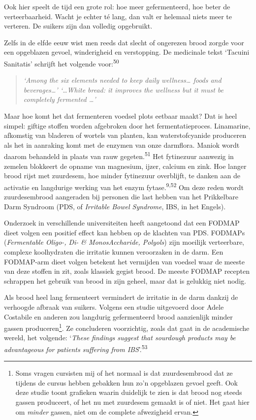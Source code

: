 \documentclass[
  11pt,
  dutch,
]{memoir}
\begin{document}
Ook hier speelt de tijd een grote rol: hoe meer gefermenteerd, hoe beter
de verteerbaarheid. Wacht je echter té lang, dan valt er helemaal niets
meer te verteren. De suikers zijn dan volledig opgebruikt.

Zelfs in de elfde eeuw wist men reeds dat slecht of ongerezen brood
zorgde voor een opgeblazen gevoel, winderigheid en verstopping. De
medicinale tekst `Tacuini Sanitatis' schrijft het volgende
voor:\textsuperscript{50}

\begin{quote}
\emph{`Among the six elements needed to keep daily wellness\ldots{}
foods and beverages\ldots{}' `\ldots White bread: it improves the
wellness but it must be completely fermented \ldots{}'}
\end{quote}

Maar hoe komt het dat fermenteren voedsel plots eetbaar maakt? Dat is
heel simpel: giftige stoffen worden afgebroken door het
fermentatieproces. Linamarine, afkomstig van bladeren of wortels van
planten, kan waterstofcyanide produceren als het in aanraking komt met
de enzymen van onze darmflora. Maniok wordt daarom behandeld in plaats
van rauw gegeten.\textsuperscript{51} Het fytinezuur aanwezig in zemelen
blokkeert de opname van magnesium, ijzer, calcium en zink. Hoe langer
brood rijst met zuurdesem, hoe minder fytinezuur overblijft, te danken
aan de activatie en langdurige werking van het enzym
fytase.\textsuperscript{9,52} Om deze reden wordt zuurdesembrood
aangeraden bij personen die last hebben van het Prikkelbare Darm
Syndroom (PDS, of \emph{Irritable Bowel Syndrome}, IBS, in het Engels).

Onderzoek in verschillende universiteiten heeft aangetoond dat een
FODMAP dieet volgen een positief effect kan hebben op de klachten van
PDS. FODMAPs (\emph{Fermentable Oligo-, Di- \& MonosAccharide, Polyols})
zijn moeilijk verteerbare, complexe koolhydraten die irritatie kunnen
veroorzaken in de darm. Een FODMAP-arm dieet volgen betekent het
vermijden van voedsel waar de meeste van deze stoffen in zit, zoals
klassiek gegist brood. De meeste FODMAP recepten schrappen het gebruik
van brood in zijn geheel, maar dat is gelukkig niet nodig.

Als brood heel lang fermenteert vermindert de irritatie in de darm
dankzij de verhoogde afbraak van suikers. Volgens een studie uitgevoerd
door Adele Costabile en anderen zou langdurig gefermenteerd brood
aanzienlijk minder gassen produceren\footnote{Soms vragen cursisten mij
  of het normaal is dat zuurdesembrood dat ze tijdens de cursus hebben
  gebakken hun zo'n opgeblazen gevoel geeft. Ook deze studie toont
  grafieken waarin duidelijk te zien is dat brood nog steeds gassen
  produceert, of het nu met zuurdesem gemaakt is of niet. Het gaat hier
  om \emph{minder} gassen, niet om de complete afwezigheid ervan.}. Ze
concluderen voorzichtig, zoals dat gaat in de academische wereld, het
volgende: `\emph{These findings suggest that sourdough products may be
advantageous for patients suffering from IBS}'.\textsuperscript{53}
\end{document}
